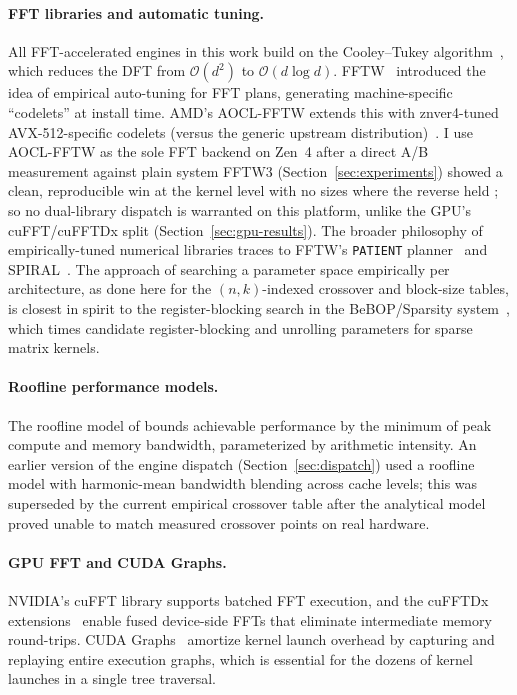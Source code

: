 \documentclass[11pt]{article}
\newcommand{\bigO}{\mathcal{O}}
\begin{document}
\paragraph{FFT libraries and automatic tuning.}
All FFT-accelerated engines in this work build on the Cooley--Tukey
algorithm~\citep{cooley1965}, which reduces the DFT from $\bigO(d^2)$ to
$\bigO(d \log d)$. FFTW~\citep{frigo2005} introduced the idea of empirical
auto-tuning for FFT plans, generating machine-specific ``codelets'' at
install time.
AMD's AOCL-FFTW extends this with znver4-tuned AVX-512-specific codelets
(versus the generic upstream distribution)~\citep{aocl2024}. I use
AOCL-FFTW as the sole FFT backend on Zen~4 after a direct A/B measurement
against plain system FFTW3 (Section~\ref{sec:experiments}) showed a clean,
reproducible win at the kernel level with no sizes where the reverse held
; so no dual-library dispatch is warranted on this platform, unlike the
GPU's cuFFT/cuFFTDx split (Section~\ref{sec:gpu-results}). The broader
philosophy of empirically-tuned numerical libraries traces to
FFTW's \texttt{PATIENT} planner~\citep{frigo2005} and
SPIRAL~\citep{pueschel2005}.  The approach of searching a parameter
space empirically per architecture, as done here for the
$(n,k)$-indexed crossover and block-size tables, is closest in
spirit to the register-blocking search in the BeBOP/Sparsity
system~\citep{demmel2004}, which times candidate register-blocking
and unrolling parameters for sparse matrix kernels.

\paragraph{Roofline performance models.}
The roofline model of \citet{williams2009} bounds achievable performance
by the minimum of peak compute and memory bandwidth, parameterized by
arithmetic intensity.  An earlier version of the engine dispatch
(Section~\ref{sec:dispatch}) used a roofline model with harmonic-mean
bandwidth blending across cache levels; this was superseded by the
current empirical crossover table after the analytical model proved
unable to match measured crossover points on real hardware.

\paragraph{GPU FFT and CUDA Graphs.}
NVIDIA's cuFFT library supports batched FFT execution, and the cuFFTDx
extensions~\citep{nvidia2024cufftdx} enable fused device-side FFTs
that eliminate intermediate memory round-trips. CUDA
Graphs~\citep{nvidia2024cudagraphs} amortize kernel launch overhead by
capturing and replaying entire execution graphs, which is essential for
the dozens of kernel launches in a single tree traversal.
\end{document}
